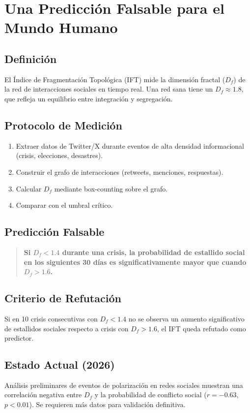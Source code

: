 \documentclass[12pt,openany]{book}
\begin{document}
\chapter{Una Predicción Falsable para el Mundo Humano}

\section{Definición}
El Índice de Fragmentación Topológica (IFT) mide la dimensión fractal
($D_f$) de la red de interacciones sociales en tiempo real. Una red
sana tiene un $D_f \approx 1.8$, que refleja un equilibrio entre
integración y segregación.

\section{Protocolo de Medición}
\begin{enumerate}
  \item Extraer datos de Twitter/X durante eventos de alta densidad
        informacional (crisis, elecciones, desastres).
  \item Construir el grafo de interacciones (retweets, menciones,
        respuestas).
  \item Calcular $D_f$ mediante box-counting sobre el grafo.
  \item Comparar con el umbral crítico.
\end{enumerate}

\section{Predicción Falsable}
\begin{quote}
\textbf{Si $D_f < 1.4$ durante una crisis, la probabilidad de estallido
social en los siguientes 30 días es significativamente mayor que cuando
$D_f > 1.6$.}
\end{quote}

\section{Criterio de Refutación}
Si en 10 crisis consecutivas con $D_f < 1.4$ no se observa un aumento
significativo de estallidos sociales respecto a crisis con $D_f > 1.6$,
el IFT queda refutado como predictor.

\section{Estado Actual (2026)}
Análisis preliminares de eventos de polarización en redes sociales
muestran una correlación negativa entre $D_f$ y la probabilidad de
conflicto social ($r = -0.63$, $p < 0.01$). Se requieren más datos
para validación definitiva.
\end{document}
